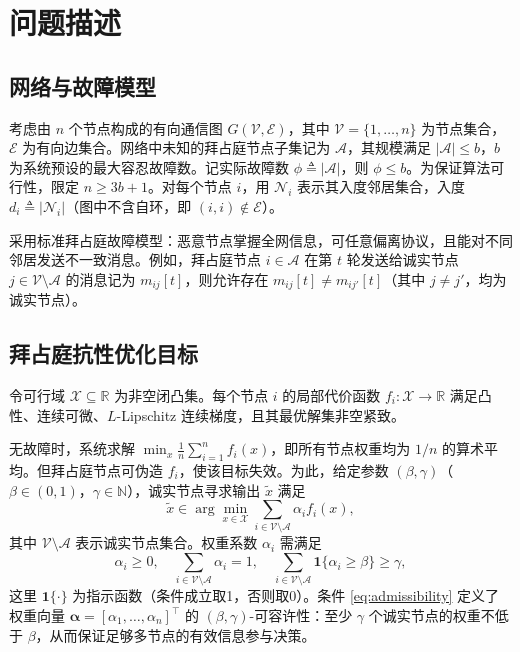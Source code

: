 \chapter{问题描述}

\section{网络与故障模型}
考虑由 $n$ 个节点构成的有向通信图 $G(\mathcal{V},\mathcal{E})$，其中 $\mathcal{V}=\{1,\dots,n\}$ 为节点集合，$\mathcal{E}$ 为有向边集合。网络中未知的拜占庭节点子集记为 $\mathcal{A}$，其规模满足 $|\mathcal{A}|\le b$，$b$ 为系统预设的最大容忍故障数。记实际故障数 $\phi\triangleq|\mathcal{A}|$，则 $\phi\le b$。为保证算法可行性，限定 $n\ge 3b+1$。对每个节点 $i$，用 $\mathcal{N}_i$ 表示其入度邻居集合，入度 $d_i\triangleq|\mathcal{N}_i|$（图中不含自环，即 $(i,i)\notin\mathcal{E}$）。

采用标准拜占庭故障模型：恶意节点掌握全网信息，可任意偏离协议，且能对不同邻居发送不一致消息。例如，拜占庭节点 $i\in\mathcal{A}$ 在第 $t$ 轮发送给诚实节点 $j\in\mathcal{V}\setminus\mathcal{A}$ 的消息记为 $m_{ij}[t]$，则允许存在 $m_{ij}[t]\ne m_{ij'}[t]$（其中 $j\ne j'$，均为诚实节点）。

\section{拜占庭抗性优化目标}
令可行域 $\mathcal{X}\subseteq\mathbb{R}$ 为非空闭凸集。每个节点 $i$ 的局部代价函数 $f_i:\mathcal{X}\to\mathbb{R}$ 满足凸性、连续可微、$L$-Lipschitz 连续梯度，且其最优解集非空紧致。

无故障时，系统求解 $\min_x \frac{1}{n}\sum_{i=1}^{n} f_i(x)$，即所有节点权重均为 $1/n$ 的算术平均。但拜占庭节点可伪造 $f_i$，使该目标失效。为此，给定参数 $(\beta,\gamma)$（$\beta\in(0,1)$，$\gamma\in\mathbb{N}$），诚实节点寻求输出 $\widetilde{x}$ 满足
\begin{equation}
\widetilde{x}\in\arg\min_{x\in\mathcal{X}}\sum_{i\in\mathcal{V}\setminus\mathcal{A}}\alpha_i f_i(x),
\label{eq:robust}
\end{equation}
其中 $\mathcal{V}\setminus\mathcal{A}$ 表示诚实节点集合。权重系数 $\alpha_i$ 需满足
\begin{equation}
\alpha_i\ge0,\quad \sum_{i\in\mathcal{V}\setminus\mathcal{A}}\alpha_i=1,\quad
\sum_{i\in\mathcal{V}\setminus\mathcal{A}}\mathbf{1}\{\alpha_i\ge\beta\}\ge\gamma,
\label{eq:admissibility}
\end{equation}
这里 $\mathbf{1}\{\cdot\}$ 为指示函数（条件成立取1，否则取0）。条件 \eqref{eq:admissibility} 定义了权重向量 $\boldsymbol{\alpha}=[\alpha_1,\dots,\alpha_n]^\top$ 的 $(\beta,\gamma)$-可容许性：至少 $\gamma$ 个诚实节点的权重不低于 $\beta$，从而保证足够多节点的有效信息参与决策。

